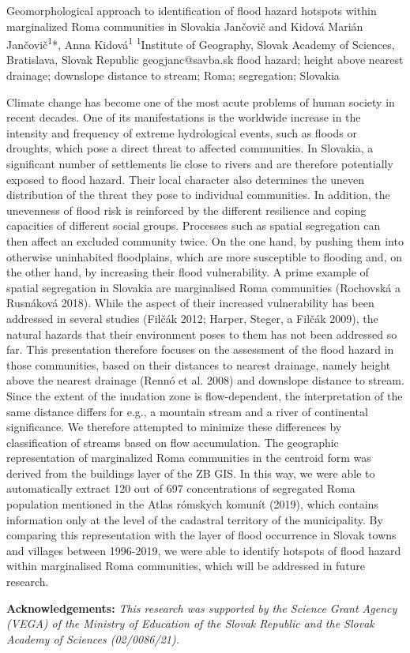 \abstract
{Geomorphological approach to identification of flood hazard hotspots within marginalized Roma communities in Slovakia} %
{Jančovič and Kidová} %
{Marián Jančovič\textsuperscript{1}*, Anna Kidová\textsuperscript{1}} %
{\TLtag} %
{\textsuperscript{1}Institute of Geography, Slovak Academy of Sciences, Bratislava, Slovak Republic
} %
{geogjanc@savba.sk}  %
{flood hazard; height above nearest drainage; downslope distance to stream; Roma; segregation; Slovakia}%
{Climate change has become one of the most acute problems of human society in recent decades. One of its manifestations is the worldwide increase in the intensity and frequency of extreme hydrological events, such as floods or droughts, which pose a direct threat to affected communities. In Slovakia, a significant number of settlements lie close to rivers and are therefore potentially exposed to flood hazard. Their local character also determines the uneven distribution of the threat they pose to individual communities. In addition, the unevenness of flood risk is reinforced by the different resilience and coping capacities of different social groups. Processes such as spatial segregation can then affect an excluded community twice. On the one hand, by pushing them into otherwise uninhabited floodplains, which are more susceptible to flooding and, on the other hand, by increasing their flood vulnerability. A prime example of spatial segregation in Slovakia are marginalised Roma communities (Rochovská a Rusnáková 2018). While the aspect of their increased vulnerability has been addressed in several studies (Filčák 2012; Harper, Steger, a Filčák 2009), the natural hazards that their environment poses to them has not been addressed so far. This presentation therefore focuses on the assessment of the flood hazard in those communities, based on their distances to nearest drainage, namely height above the nearest drainage (Rennó et al. 2008) and downslope distance to stream. Since the extent of the inudation zone is flow-dependent, the interpretation of the same distance differs for e.g., a mountain stream and a river of continental significance. We therefore attempted to minimize these differences by classification of streams based on flow accumulation. The geographic representation of marginalized Roma communities in the centroid form was derived from the buildings layer of the ZB GIS. In this way, we were able to automatically extract 120 out of 697 concentrations of segregated Roma population mentioned in the Atlas rómskych komunít (2019), which contains information only at the level of the cadastral territory of the municipality. By comparing this representation with the layer of flood occurrence in Slovak towns and villages between 1996-2019, we were able to identify hotspots of flood hazard within marginalised Roma communities, which will be addressed in future research.

\vspace{0.5em}
\noindent
\textbf{Acknowledgements:}	
\textit{This research was supported by the Science Grant Agency (VEGA) of the Ministry of Education of the Slovak Republic and the Slovak Academy of Sciences (02/0086/21).}
}%
